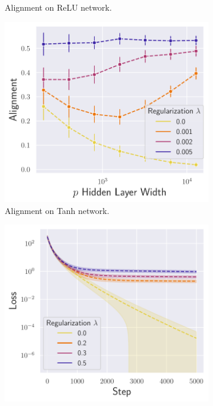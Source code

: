 \begin{figure}[h]
\begin{subfigure}[b]{.33\textwidth}
  \caption{Alignment on ReLU network.}
  \label{fig:align_nn_relu_autograd_l2}
\end{subfigure}\hfill
\begin{subfigure}[b]{.33\textwidth}
  \centering
  \includegraphics[width=\linewidth]{figures/df_nn_tanh_autograd_l2_v6.pdf}
  \caption{Alignment on Tanh network.}
  \label{fig:align_nn_tanh_autograd_l2}
\end{subfigure}
\medskip
\begin{subfigure}[b]{.33\textwidth}
  \centering
  \includegraphics[width=\linewidth]{figures/loss_lr_non_autograd_l2_v1.pdf}

\end{subfigure}
\end{figure}
